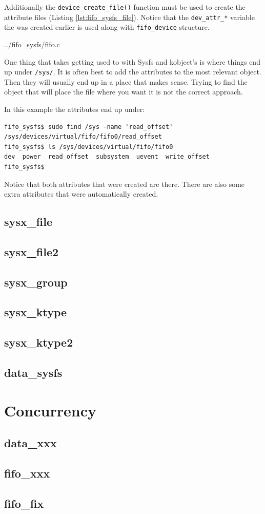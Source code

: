 \documentclass{article}
\begin{document}
Additionally the \verb+device_create_file()+ function must be used
to create the attribute files (Listing \ref{lst:fifo_sysfs_file}).
Notice that the \verb+dev_attr_*+ variable the was created earlier
is used along with \verb+fifo_device+ structure.


	{../fifo_sysfs/fifo.c}

One thing that takes getting used to with Sysfs and kobject's is where
things end up under \verb+/sys/+.
It is often best to add the attributes to the most relevant object.
Then they will usually end up in a place that makes sense.
Trying to find the object that will place the file where you want it
is not the correct approach.

In this example the attributes end up under:

\begin{verbatim}
fifo_sysfs$ sudo find /sys -name 'read_offset'
/sys/devices/virtual/fifo/fifo0/read_offset
fifo_sysfs$ ls /sys/devices/virtual/fifo/fifo0
dev  power  read_offset  subsystem  uevent  write_offset
fifo_sysfs$ 
\end{verbatim}

Notice that both attributes that were created are there.
There are also some extra attributes that were automatically
created.



\clearpage
\subsection{sysx\_file}
\subsection{sysx\_file2}
\subsection{sysx\_group}
\subsection{sysx\_ktype}
\subsection{sysx\_ktype2}
\subsection{data\_sysfs}

\section{Concurrency}
\subsection{data\_xxx}
\subsection{fifo\_xxx}
\subsection{fifo\_fix}

\pagebreak
\printbibliography

\end{document}
